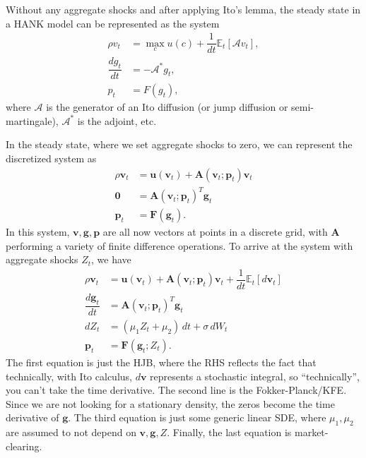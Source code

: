 \documentclass[12 pt, oneside]{article}
\theoremstyle{definition}
\theoremstyle{definition}
\theoremstyle{definition}
\newcommand{\bfg}{\mathbf{g}}
\newcommand{\bfp}{\mathbf{p}}
\newcommand{\bfu}{\mathbf{u}}
\newcommand{\bfv}{\mathbf{v}}
\newcommand{\bfA}{\mathbf{A}}
\newcommand{\bfF}{\mathbf{F}}
\newcommand{\bfzero}{\mathbf{0}}
\newcommand{\E}{\mathbb{E}}
\newcommand{\calA}{\mathcal{A}}
\begin{document}
Without any aggregate shocks and after applying Ito's lemma, the steady state in a HANK model can be represented as the system
\begin{align*}
\rho v_t & = \max_c u(c) +\dfrac{1}{dt} \E_t[\calA v_t],\\
\dfrac{dg_t}{dt} & = -\calA^*g_t,\\
p_t & = F(g_t),
\end{align*}
where $\calA$ is the generator of an Ito diffusion (or jump diffusion or semi-martingale), $\calA^*$ is the adjoint, etc.

In the steady state, where we set aggregate shocks to zero, we can represent the discretized system as
\begin{align*}
\rho \bfv_t & = \bfu(\bfv_t) + \bfA(\bfv_t;\bfp_t) \bfv_t\\
\bfzero & = \bfA(\bfv_t;\bfp_t)^T\bfg_t\\
\bfp_t & = \bfF(\bfg_t).
\end{align*}
In this system, $\bfv, \bfg, \bfp$ are all now vectors at points in a discrete grid, with $\bfA$ performing a variety of finite difference operations. To arrive at the system with aggregate shocks $Z_t$, we have
\begin{align*}
\rho \bfv_t & = \bfu(\bfv_t) + \bfA(\bfv_t;\bfp_t) \bfv_t + \dfrac{1}{dt} \E_t[d\bfv_t]\\
\dfrac{d\bfg_t}{dt} & = \bfA(\bfv_t;\bfp_t)^T\bfg_t\\
dZ_t & = (\mu_1 Z_t+\mu_2)\,dt + \sigma\, dW_t\\
\bfp_t & = \bfF(\bfg_t; Z_t).
\end{align*}
The first equation is just the HJB, where the RHS reflects the fact that technically, with Ito calculus, $d\bfv$ represents a stochastic integral, so ``technically'', you can't take the time derivative. The second line is the Fokker-Planck/KFE. Since we are not looking for a stationary density, the zeros become the time derivative of $\bfg$. The third equation is just some generic linear SDE, where $\mu_1,\mu_2$ are assumed to not depend on $\bfv,\bfg,Z$. Finally, the last equation is market-clearing.
\end{document}
